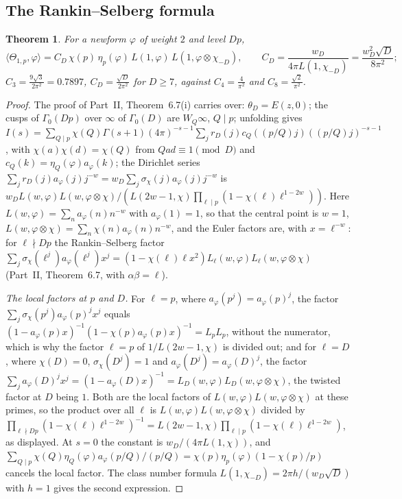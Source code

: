 \documentclass[11pt]{amsart}
\newtheorem{theorem}{Theorem}[section]
\theoremstyle{remark}
\begin{document}
\subsection{The Rankin--Selberg formula}
\begin{theorem}\label{thm:RS}
For a newform $\varphi$ of weight $2$ and level $Dp$,
\[
\langle\Theta_{1,p},\varphi\rangle=C_D\,\chi(p)\,\eta_p(\varphi)\,L(1,\varphi)\,L(1,\varphi\otimes\chi_{-D}),\qquad C_D=\frac{w_D}{4\pi L(1,\chi_{-D})}=\frac{w_D^2\sqrt D}{8\pi^2};
\]
$C_3=\frac{9\sqrt3}{2\pi^2}=0.7897$, $C_D=\frac{\sqrt D}{2\pi^2}$ for $D\ge7$, against $C_4=\frac4{\pi^2}$ and $C_8=\frac{\sqrt2}{\pi^2}$.
\end{theorem}
\begin{proof}
The proof of Part~II, Theorem~6.7(i) carries over: $\theta_D=E(z,0)$; the cusps of $\Gamma_0(Dp)$ over $\infty$ of $\Gamma_0(D)$ are $W_Q\infty$, $Q\mid p$; unfolding gives $I(s)=\sum_{Q\mid p}\chi(Q)\Gamma(s+1)(4\pi)^{-s-1}\sum_{j}r_D(j)c_Q((p/Q)j)((p/Q)j)^{-s-1}$, with $\chi(a)\chi(d)=\chi(Q)$ from $Qad\equiv1\pmod D$ and $c_Q(k)=\eta_Q(\varphi)a_\varphi(k)$; the Dirichlet series $\sum_jr_D(j)a_\varphi(j)j^{-w}=w_D\sum_j\sigma_\chi(j)a_\varphi(j)j^{-w}$ is $w_DL(w,\varphi)L(w,\varphi\otimes\chi)/(L(2w-1,\chi)\prod_{\ell\mid p}(1-\chi(\ell)\ell^{1-2w}))$. Here $L(w,\varphi)=\sum_na_\varphi(n)n^{-w}$ with $a_\varphi(1)=1$, so that the central point is $w=1$, $L(w,\varphi\otimes\chi)=\sum_n\chi(n)a_\varphi(n)n^{-w}$, and the Euler factors are, with $x=\ell^{-w}$: for $\ell\nmid Dp$ the Rankin--Selberg factor $\sum_j\sigma_\chi(\ell^j)a_\varphi(\ell^j)x^j=(1-\chi(\ell)\ell x^2)L_\ell(w,\varphi)L_\ell(w,\varphi\otimes\chi)$ (Part~II, Theorem~6.7, with $\alpha\beta=\ell$).

\emph{The local factors at $p$ and $D$.} For $\ell=p$, where $a_\varphi(p^j)=a_\varphi(p)^j$, the factor $\sum_j\sigma_\chi(p^j)a_\varphi(p)^jx^j$ equals $(1-a_\varphi(p)x)^{-1}(1-\chi(p)a_\varphi(p)x)^{-1}=L_pL_p$, without the numerator, which is why the factor $\ell=p$ of $1/L(2w-1,\chi)$ is divided out; and for $\ell=D$, where $\chi(D)=0$, $\sigma_\chi(D^j)=1$ and $a_\varphi(D^j)=a_\varphi(D)^j$, the factor $\sum_ja_\varphi(D)^jx^j=(1-a_\varphi(D)x)^{-1}=L_D(w,\varphi)L_D(w,\varphi\otimes\chi)$, the twisted factor at $D$ being $1$. Both are the local factors of $L(w,\varphi)L(w,\varphi\otimes\chi)$ at these primes, so the product over all $\ell$ is $L(w,\varphi)L(w,\varphi\otimes\chi)$ divided by $\prod_{\ell\nmid Dp}(1-\chi(\ell)\ell^{1-2w})^{-1}=L(2w-1,\chi)\prod_{\ell\mid p}(1-\chi(\ell)\ell^{1-2w})$, as displayed. At $s=0$ the constant is $w_D/(4\pi L(1,\chi))$, and $\sum_{Q\mid p}\chi(Q)\eta_Q(\varphi)a_\varphi(p/Q)/(p/Q)=\chi(p)\eta_p(\varphi)(1-\chi(p)/p)$ cancels the local factor. The class number formula $L(1,\chi_{-D})=2\pi h/(w_D\sqrt D)$ with $h=1$ gives the second expression.
\end{proof}
\end{document}
